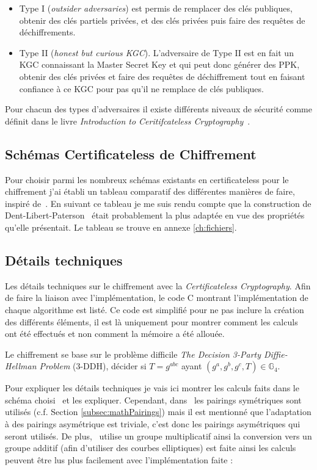 \begin{itemize}
	\item Type I (\textit{outsider adversaries}) est permis de remplacer des clés publiques, obtenir des clés partiels privées, et des clés privées puis faire des requêtes de déchiffrements.
	\item Type II (\textit{honest but curious KGC}). L'adversaire de Type II est en fait un KGC connaissant la Master Secret Key et qui peut donc générer des PPK, obtenir des clés privées et faire des requêtes de déchiffrement tout en faisant confiance à ce KGC pour pas qu'il ne remplace de clés publiques.
\end{itemize}

Pour chacun des types d'adversaires il existe différents niveaux de sécurité comme définit dans le livre \textit{Introduction to Ceritifcateless Cryptography}~\cite{bookIntroCertificateless}.
\subsection{Schémas Certificateless de Chiffrement}
Pour choisir parmi les nombreux schémas existants en certificateless pour le chiffrement j'ai établi un tableau comparatif des différentes manières de faire, inspiré de~\cite{bookIntroCertificateless}. En suivant ce tableau je me suis rendu compte que la construction de Dent-Libert-Paterson~\cite{DBLP:conf/pkc/DentLP08} était probablement la plus adaptée en vue des propriétés qu'elle présentait. Le tableau se trouve en annexe \ref{ch:fichiers}.

\subsection{Détails techniques}
Les détails techniques sur le chiffrement avec la \textit{Certificateless Cryptography}. Afin de faire la liaison avec l'implémentation, le code C montrant l'implémentation de chaque algorithme est listé. Ce code est simplifié pour ne pas inclure la création des différents éléments, il est là uniquement pour montrer comment les calculs ont été effectués et non comment la mémoire a été allouée.

Le chiffrement se base sur le problème difficile \textit{The Decision 3-Party Diffie-Hellman Problem} (3-DDH), décider si $T =g^{abc}$ ayant $(g^a, g^b, g^c, T) \in \mathbb{G}_4$.

Pour expliquer les détails techniques je vais ici montrer les calculs faits dans le schéma choisi~\cite{DBLP:conf/pkc/DentLP08} et les expliquer. Cependant, dans~\cite{DBLP:conf/pkc/DentLP08} les pairings symétriques sont utilisés (c.f. Section \ref{subsec:mathPairings}) mais il est mentionné que l'adaptation à des pairings asymétrique est triviale, c'est donc les pairings asymétriques qui seront utilisés. De plus,~\cite{DBLP:conf/pkc/DentLP08} utilise un groupe multiplicatif ainsi la conversion vers un groupe additif (afin d'utiliser des courbes elliptiques) est faite ainsi les calculs peuvent être lus plus facilement avec l'implémentation faite :


